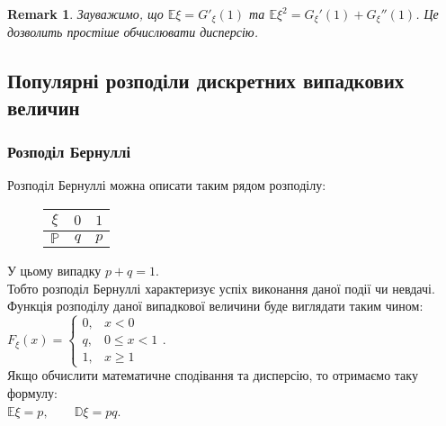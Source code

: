 \documentclass[a4paper, 10pt]{article}
\theoremstyle{theoremdd}
\newtheorem{remark}[theorem]{Remark}
\begin{document}
\begin{remark}
Зауважимо, що $\mathbb{E} \xi = G'_\xi(1)$ та $\mathbb{E}\xi^2 = G_\xi'(1) + G_\xi''(1)$. Це дозволить простіше обчислювати дисперсію.
\end{remark}

\subsection{Популярні розподіли дискретних випадкових величин}
\subsubsection{Розподіл Бернуллі}
Розподіл Бернуллі можна описати таким рядом розподілу:
\begin{figure}[H]
\centering
\begin{tabular}{c|c|c}
$\xi$ & $0$ & $1$ \\
\hline
$\mathbb{P}$ & $q$ & $p$
\end{tabular}
\end{figure}
\noindent
У цьому випадку $p+q = 1$.\\
Тобто розподіл Бернуллі характеризує успіх виконання даної події чи невдачі.\\
Функція розподілу даної випадкової величини буде виглядати таким чином:\\
$F_\xi(x) = \begin{cases} 0, & x < 0 \\ q, & 0 \leq x < 1 \\ 1, & x \geq 1 \end{cases}$.\\
Якщо обчислити математичне сподівання та дисперсію, то отримаємо таку формулу:\\
$\mathbb{E}\xi = p, \qquad \mathbb{D}\xi = pq$.
\end{document}
